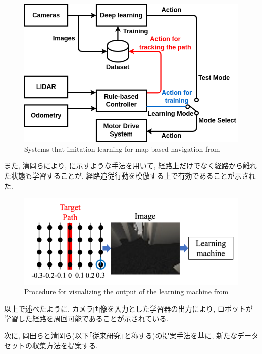 \begin{figure}[h]
     \centering
     \includegraphics[keepaspectratio, scale=0.42]
     {images/okada-si2020.png}
     \caption{Systems that imitation learning for map-based navigation from \cite{okada-si2020}}
     \label{Fig:okada-method}
     \end{figure}

\newpage
また, 清岡ら\cite{kiyooka-si}により, に示すような手法を用いて, 経路上だけでなく経路から離れた状態も学習することが, 経路追従行動を模倣する上で有効であることが示された. 

\vspace{10mm}

\begin{figure}[h]
     \centering
     \includegraphics[keepaspectratio, scale=0.45]{images/kiyooka-si-1.png}
     \caption{Procedure for visualizing the output of the learning machine from \cite{kiyooka-si}}
     \label{Fig:kiyooka-si}
     \end{figure}

\vspace{20mm}
以上で述べたように, カメラ画像を入力とした学習器の出力により, ロボットが学習した経路を周回可能であることが示されている. \par 次に, 岡田らと清岡ら(以下｢従来研究｣と称する)の提案手法を基に, 新たなデータセットの収集方法を提案する.

